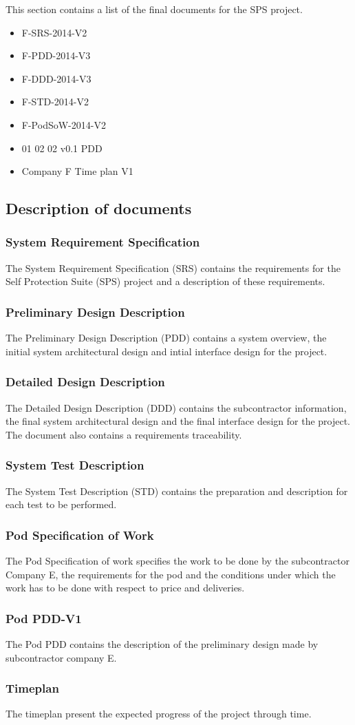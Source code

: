 This section contains a list of the final documents for the SPS project.\\
\begin{itemize}
\item F-SRS-2014-V2
\item F-PDD-2014-V3
\item F-DDD-2014-V3
\item F-STD-2014-V2
\item F-PodSoW-2014-V2
\item 01 02 02 v0.1 PDD
\item Company F Time plan V1\\
\end{itemize}

\subsection{Description of documents}
\subsubsection{System Requirement Specification}
The System Requirement Specification (SRS) contains the requirements for the Self Protection Suite (SPS) project and a description of these requirements.\\
\subsubsection{Preliminary Design Description}
The Preliminary Design Description (PDD) contains a system overview, the initial system architectural design and intial interface design for the project.\\
\subsubsection{Detailed Design Description}
The Detailed Design Description (DDD) contains the subcontractor information, the final system architectural design and the final interface design for the project. The document also contains a requirements traceability.\\
\subsubsection{System Test Description}
The System Test Description (STD) contains  the preparation and description for each test to be performed.\\
\newpage
\subsubsection{Pod Specification of Work}
The Pod Specification of work specifies the work to be done by the subcontractor Company E, the requirements for the pod and the conditions under which the work has to be done with respect to price and deliveries.
\subsubsection{Pod PDD-V1}
The Pod PDD contains the description of the preliminary design made by subcontractor company E.
\subsubsection{Timeplan}
The timeplan present the expected progress of the project through time.
